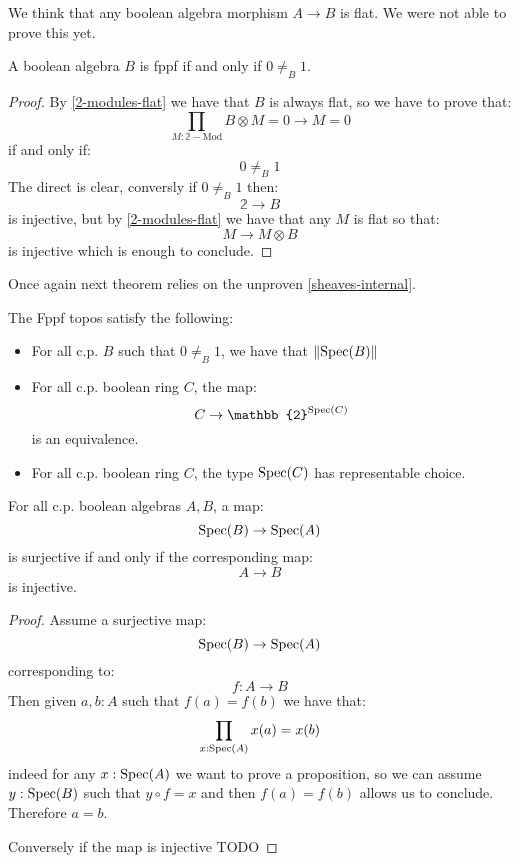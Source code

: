 \begin{remark}
We think that any boolean algebra morphism $A\to B$ is flat. We were not able to prove this yet.
\end{remark}

\begin{lemma}
A boolean algebra $B$ is fppf if and only if $0\not=_B1$.
\end{lemma}

\begin{proof}
By \cref{2-modules-flat} we have that $B$ is always flat, so we have to prove that:
\[\prod_{M:\mathbb{2}-\mathrm{Mod}} B\otimes M = 0 \to M=0\]
if and only if:
\[0\not=_B1\]
The direct is clear, conversly if $0\not=_B1$ then:
\[\mathbb{2}\to B\]
is injective, but by \cref{2-modules-flat} we have that any $M$ is flat so that:
\[M\to M\otimes B\]
is injective which is enough to conclude.
\end{proof}

Once again next theorem relies on the unproven \cref{sheaves-internal}.

\begin{theorem}
The Fppf topos satisfy the following:
\begin{itemize}
\item For all c.p. $B$ such that $0\not=_B1$, we have that $\lVert \operatorname{Spec}(B) \rVert$
\item For all c.p. boolean ring $C$, the map:
\[C\to \mathbb{2}^{\Spec(C)}\]
is an equivalence.
\item For all c.p. boolean ring $C$, the type $\operatorname{Spec}(C)$ has representable choice.
\end{itemize}
\end{theorem}

\begin{lemma}
For all c.p. boolean algebras $A,B$, a map:
\[\operatorname{Spec}(B)\to \operatorname{Spec}(A)\]
is surjective if and only if the corresponding map:
\[A\to B\]
is injective.
\end{lemma}

\begin{proof}
Assume a surjective map:
\[\operatorname{Spec}(B)\to \operatorname{Spec}(A)\]
corresponding to:
\[f:A\to B\]
Then given $a,b:A$ such that $f(a)=f(b)$ we have that:
\[\prod_{x:\operatorname{Spec}(A)} x(a) = x(b)\]
indeed for any $x:\operatorname{Spec}(A)$ we want to prove a proposition, so we can assume $y:\operatorname{Spec}(B)$ such that $y\circ f = x$ and then $f(a)=f(b)$ allows us to conclude. Therefore $a=b$.

Conversely if the map is injective TODO
\end{proof}


